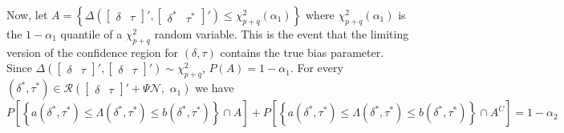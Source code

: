 \documentclass[11pt]{article}
\begin{document}
Now, let $A = \left \{\Delta \left( \begin{bmatrix}
\delta & \tau
\end{bmatrix}', \begin{bmatrix}
\delta^{*} & \tau^{*}
\end{bmatrix}' \right) \leq \chi_{p+q}^2(\alpha_1)  \right \}$ where $\chi_{p+q}^2(\alpha_1)$ is the $1-\alpha_1$ quantile of a $\chi_{p+q}^2$ random variable. This is the event that the limiting version of the confidence region for $(\delta, \tau)$ contains the true bias parameter. Since $\Delta \left( \begin{bmatrix}
\delta & \tau
\end{bmatrix}', \begin{bmatrix}
\delta & \tau
\end{bmatrix}' \right) \sim \chi_{p+q}^2$, $P(A) = 1-\alpha_1$. For every $(\delta^{*}, \tau^{*}) \in  \mathscr{R} \left( \begin{bmatrix}
\delta & \tau
\end{bmatrix}' + \Psi \mathscr{N}, \,\, \alpha_1 \right)$ we have
\[
P\left[\left\{ a(\delta^{*}, \tau^{*}) \leq \Lambda(\delta^{*}, \tau^{*}) \leq b(\delta^{*}, \tau^{*})  \right\} \cap A \right] + P\left[\left\{ a(\delta^{*}, \tau^{*}) \leq \Lambda(\delta^{*}, \tau^{*}) \leq b(\delta^{*}, \tau^{*})  \right\} \cap A^C \right] = 1-\alpha_2
\]
\end{document}
